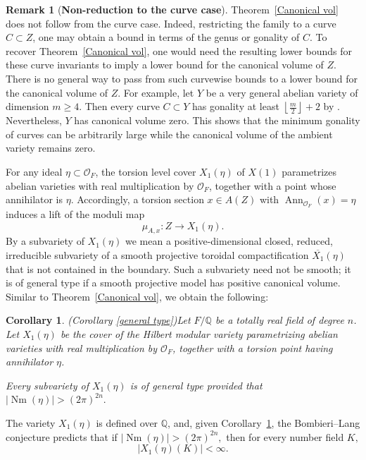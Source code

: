 \documentclass[12 pt]{amsart}
\newtheorem{Corollary}[theorem]{Corollary}
\theoremstyle{definition}
\newtheorem*{Remark*}{Remark}
\newcommand{\Q}{\mathbb{Q}} %
\newcommand{\Xb}{\overline{X_{1}}}
\newcommand{\Nm}{\operatorname{Nm}}
\begin{document}
\begin{Remark*}[\textbf{Non-reduction to the curve case}]
Theorem~\ref{Canonical vol} does not follow from the curve case.
Indeed, restricting the family to a curve \(C\subset Z\), one may obtain a bound in
terms of the genus or gonality of \(C\). To recover
Theorem~\ref{Canonical vol}, one would need the resulting lower bounds for
these curve invariants to imply a lower bound for the
canonical volume of \(Z\). There is no general way to pass from such curvewise bounds to a lower bound for the canonical volume of \(Z\). For example, let \(Y\) be a very general abelian
variety of dimension \(m\geq 4\). Then every curve
\(C\subset Y\) has gonality at least
\(\left\lfloor\frac{m}{2}\right\rfloor+2\)
by \cite[Corollary~4.7]{martin2020gonality}. Nevertheless,
\(Y\) has canonical volume zero. This shows that the
minimum gonality of curves can be arbitrarily large while the canonical
volume of the ambient variety remains zero.
\end{Remark*}
 For any ideal \(\eta\subset\mathcal O_F\), the torsion level cover
\(X_1(\eta)\) of $X(1)$ parametrizes abelian varieties with real multiplication
by \(\mathcal O_F\), together with a point whose annihilator is
\(\eta\). Accordingly, a torsion section \(x\in A(Z)\) with
\(
\operatorname{Ann}_{\mathcal O_F}(x)=\eta
\)
induces a lift of the moduli map
\[
\mu_{A,x}\colon Z\longrightarrow X_1(\eta).
\]
By a subvariety of $X_1(\eta)$ we mean a positive-dimensional closed,
reduced, irreducible subvariety of a smooth projective toroidal
compactification $\Xb(\eta)$ that is not contained in the boundary.
Such a subvariety need not be smooth; it is of general type if a smooth
projective model has positive canonical volume. Similar to 
Theorem~\ref{Canonical vol}, we obtain the following:
\begin{Corollary}(Corollary \ref{general type})\label{general type int}
Let $F/\mathbb Q$ be a totally real field of degree $n$. Let
$X_1(\eta)$ be the cover of the Hilbert modular variety parametrizing
abelian varieties with real multiplication by $\mathcal O_F$,
together with a torsion point having annihilator $\eta$.


Every subvariety of $X_1(\eta)$ is of general type provided that
\(
|\Nm(\eta)|>(2\pi)^{2n}.
\)
\end{Corollary}


The variety \(X_1(\eta)\) is defined over \(\Q\), and, given Corollary~\ref{general type int}, the Bombieri--Lang conjecture predicts that if $|\Nm(\eta)|> (2\pi)^{2n},$ then for every number field $K,$
\[
|X_1(\eta)(K)|<\infty.
\]
\end{document}
